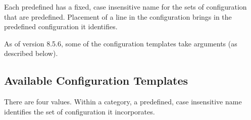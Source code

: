 Each predefined  has a fixed, case insensitive
name for the sets of configuration that are predefined. 
Placement of a  line in the configuration brings in
the predefined configuration it identifies.

As of version 8.5.6, some of the configuration templates take arguments
(as described below).

\subsection{\label{sec:Config-Templates-Available}Available
Configuration Templates}

There are four  values.
Within a category, a predefined, case insensitive name identifies
the set of configuration it incorporates. 
